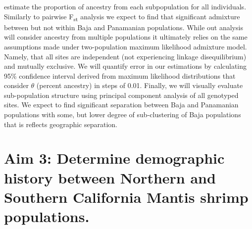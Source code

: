 \documentclass[11pt]{article}
\begin{document}
estimate the proportion of ancestry from each subpopulation for all individuals. Similarly to pairwise  F\textsubscript{st} analysis we expect to find that significant admixture between but not within Baja and Panamanian populations. While out analysis will consider ancestry from multiple populations it ultimately relies on the same assumptions made under two-population maximum likelihood admixture model. Namely, that all sites are independent (not experiencing linkage disequilibrium) and mutually exclusive. We will quantify error in our estimations by calculating 95\% confidence interval derived from maximum likelihood distributions that consider $\theta$ (percent ancestry) in steps of 0.01. Finally, we will visually evaluate sub-population structure using principal component analysis of all genotyped sites. We expect to find significant separation between Baja and Panamanian populations with some, but lower degree of sub-clustering of Baja populations that is reflects geographic separation. 


\section*{Aim 3: Determine demographic history between Northern and Southern California Mantis shrimp populations.}
\end{document}
